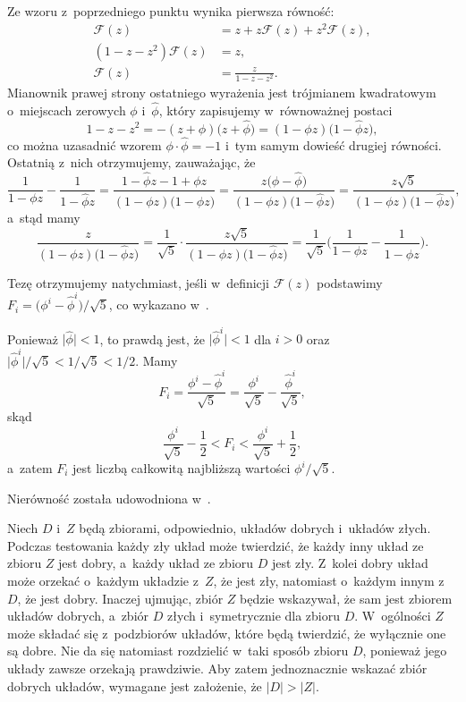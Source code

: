 \subproblem %
Ze wzoru z~poprzedniego punktu wynika pierwsza równość:
\begin{align*}
	\mathcal{F}(z) &= z+z\mathcal{F}(z)+z^2\mathcal{F}(z), \\
	(1-z-z^2)\mathcal{F}(z) &= z, \\
	\mathcal{F}(z) &= \frac{z}{1-z-z^2}.
\end{align*}
Mianownik prawej strony ostatniego wyrażenia jest trójmianem kwadratowym o~miejscach zerowych $\phi$ i~$\widehat\phi$, który zapisujemy w~równoważnej postaci
\[
	1-z-z^2 = -(z+\phi)\bigl(z+\widehat\phi\bigr) = (1-\phi z)\bigl(1-\widehat\phi z\bigr),
\]
co można uzasadnić wzorem $\phi\cdot\widehat\phi=-1$ i~tym samym dowieść drugiej równości.
Ostatnią z~nich otrzymujemy, zauważając, że
\[
	\frac{1}{1-\phi z}-\frac{1}{1-\widehat\phi z} = \frac{1-\widehat\phi z-1+\phi z}{(1-\phi z)\bigl(1-\widehat\phi z\bigr)} = \frac{z\bigl(\phi-\widehat\phi\bigr)}{(1-\phi z)\bigl(1-\widehat\phi z\bigr)} = \frac{z\sqrt{5}}{(1-\phi z)\bigl(1-\widehat\phi z\bigr)},
\]
a~stąd mamy
\[
	\frac{z}{(1-\phi z)\bigl(1-\widehat\phi z\bigr)} = \frac{1}{\sqrt{5}}\cdot\frac{z\sqrt{5}}{(1-\phi z)\bigl(1-\widehat\phi z\bigr)} = \frac{1}{\sqrt{5}}\biggl(\frac{1}{1-\phi z}-\frac{1}{1-\widehat\phi z}\biggr).
\]

\subproblem %
Tezę otrzymujemy natychmiast, jeśli w~definicji $\mathcal{F}(z)$ podstawimy $F_i=\bigl(\phi^i-\widehat\phi^i\bigr)/\sqrt{5}$, co wykazano w~.

\subproblem %
Ponieważ $\bigl|\widehat\phi\bigr|<1$, to prawdą jest, że $\bigl|\widehat\phi^i\bigr|<1$ dla $i>0$ oraz $\bigl|\widehat\phi^i\bigr|/\sqrt{5}<1/\sqrt{5}<1/2$.
Mamy
\[
	F_i = \frac{\phi^i-\widehat\phi^i}{\sqrt{5}} = \frac{\phi^i}{\sqrt{5}}-\frac{\widehat\phi^i}{\sqrt{5}},
\]
skąd
\[
	\frac{\phi^i}{\sqrt{5}}-\frac{1}{2} < F_i < \frac{\phi^i}{\sqrt{5}}+\frac{1}{2},
\]
a~zatem $F_i$ jest liczbą całkowitą najbliższą wartości $\phi^i/\sqrt{5}$.

\subproblem %
Nierówność została udowodniona w~.


\subproblem %
Niech $D$ i~$Z$ będą zbiorami, odpowiednio, układów dobrych i~układów złych.
Podczas testowania każdy zły układ może twierdzić, że każdy inny układ ze zbioru $Z$ jest dobry, a~każdy układ ze zbioru $D$ jest zły.
Z~kolei dobry układ może orzekać o~każdym układzie z~$Z$, że jest zły, natomiast o~każdym innym z~$D$, że jest dobry.
Inaczej ujmując, zbiór $Z$ będzie wskazywał, że sam jest zbiorem układów dobrych, a~zbiór $D$ złych i~symetrycznie dla zbioru $D$.
W~ogólności $Z$ może składać się z~podzbiorów układów, które będą twierdzić, że wyłącznie one są dobre.
Nie da się natomiast rozdzielić w~taki sposób zbioru $D$, ponieważ jego układy zawsze orzekają prawdziwie.
Aby zatem jednoznacznie wskazać zbiór dobrych układów, wymagane jest założenie, że $|D|>|Z|$.

